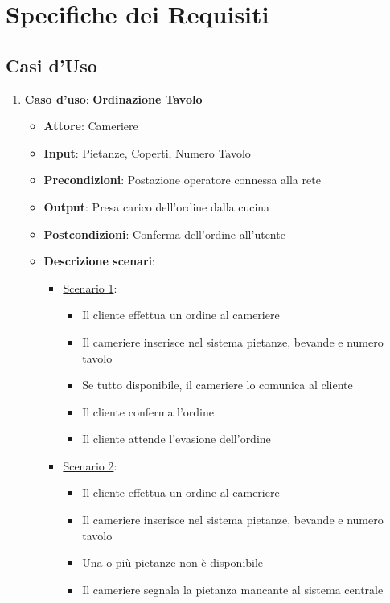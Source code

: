 \chapter{Specifiche dei Requisiti}
\section{Casi d'Uso}
\begin{enumerate}
    
    \item {\bf Caso d'uso}: \uline{{\bf Ordinazione Tavolo}}
    \begin{itemize}
        \item {\bf Attore}: Cameriere
        \item {\bf Input}: Pietanze, Coperti, Numero Tavolo
        \item {\bf Precondizioni}: Postazione operatore connessa alla rete
        \item {\bf Output}: Presa carico dell'ordine dalla cucina
        \item {\bf Postcondizioni}: Conferma dell'ordine all'utente
        \item {\bf Descrizione scenari}:
        \begin{itemize}
            \item \uline {Scenario 1}:
            \begin{itemize}
                \item Il cliente effettua un ordine al cameriere
                \item Il cameriere inserisce nel sistema pietanze, bevande e 
                    numero tavolo
                \item Se tutto disponibile, il cameriere lo comunica al cliente
                \item Il cliente conferma l'ordine
                \item Il cliente attende l'evasione dell'ordine
            \end{itemize}
            \item \uline {Scenario 2}:
            \begin{itemize}
                \item Il cliente effettua un ordine al cameriere
                \item Il cameriere inserisce nel sistema pietanze, bevande e numero tavolo
                \item Una o pi\`u pietanze non \`e disponibile
                \item Il cameriere segnala la pietanza mancante al sistema centrale

\end{itemize}
\end{itemize}
\end{itemize}
\end{enumerate}
